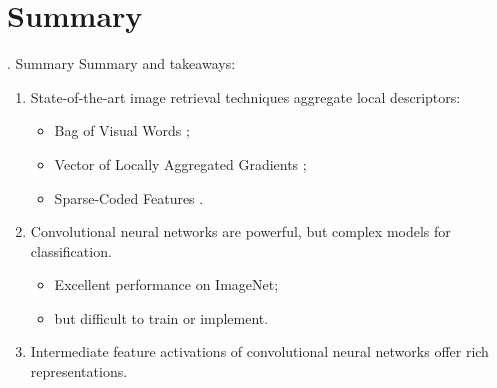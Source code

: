 \documentclass[t]{beamer}
\begin{document}
	\section{Summary}
	\begin{frame}{\thesection. Summary}
	    Summary and takeaways:
	    \begin{enumerate}[1.]
	        \item State-of-the-art image retrieval techniques aggregate local descriptors:
	        \begin{itemize}
	            \item Bag of Visual Words \cite{SivicZisserman:2003};
	            \item Vector of Locally Aggregated Gradients \cite{ArandjelovicZisserman:2013};
	            \item Sparse-Coded Features \cite{GeKeSun:2013}.
	        \end{itemize}
	        \pause
	        \item Convolutional neural networks are powerful, but complex models for classification.
	        \begin{itemize}
	            \item Excellent performance on ImageNet;
	            \item but difficult to train or implement.
	        \end{itemize}
	        \pause
	        \item Intermediate feature activations of convolutional neural networks offer rich representations.
	    \end{enumerate}
	\end{frame}
	
\end{document}
